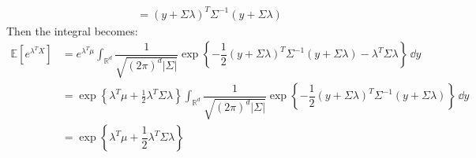 \documentclass{article}
\begin{document}
\begin{itemize}
\begin{answer}
\begin{align*}
                                                                                                                 &= (y + \Sigma\lambda)^{T}\Sigma^{-1}(y + \Sigma\lambda)                       
                        \end{align*}
                    Then the integral becomes:
                        \begin{align*}
                            \mathbb{E}[e^{\lambda^{T}X}] &= e^{\lambda^{T}\mu} \int_{\mathbb{R}^{d}}^{} \dfrac{1}{\sqrt{(2\pi)^{d}\lvert \Sigma \rvert}}\exp\left\{-\dfrac{1}{2}(y + \Sigma\lambda)^{T}\Sigma^{-1}(y + \Sigma\lambda) - \lambda^{T}\Sigma\lambda\right\} \, \dd{y}                            \\
                                                         &= \exp\left\{\lambda^{T}\mu + \frac{1}{2}\lambda^{T}\Sigma\lambda\right\} \int_{\mathbb{R}^{d}}^{} \dfrac{1}{\sqrt{(2\pi)^{d}\lvert \Sigma \rvert}}\exp\left\{-\dfrac{1}{2}(y + \Sigma\lambda)^{T}\Sigma^{-1}(y + \Sigma\lambda)\right\} \, \dd{y}  \\
                                                         &= \exp\left\{\lambda^{T} \mu + \dfrac{1}{2}\lambda^{T}\Sigma\lambda\right\}                                                                                                                                                                           
                        \end{align*}
                    
                \end{answer}


\end{itemize}
\end{document}
